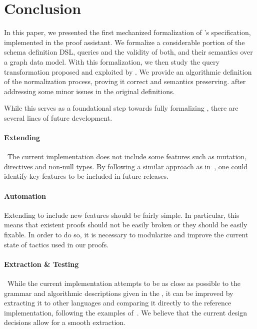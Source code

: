 \section{Conclusion}
\label{sec:conclusion}

In this paper, we presented the first mechanized formalization of \gql's specification, implemented in the \coq proof assistant.
We formalize a considerable portion of the schema definition DSL, queries and the validity of both, and their semantics over a graph data model. 
With this formalization, we then study the query transformation proposed and exploited by \HP. 
We provide an algorithmic definition of the normalization process, proving it correct and semantics preserving. after 
addressing some minor issues in the original definitions.

While this serves as a foundational step towards fully formalizing \gql, there are several lines of future development.
\paragraph{Extending \gcoql} The current implementation does not include some features such as mutation, directives and non-null types. 
By following a similar approach as in~\cite{empiricalgql}, one could identify key features to be included in future releases.

\paragraph{Automation} Extending \gcoql to include new features should be fairly simple. In particular, this means that existent proofs should 
not be easily broken or they should be easily fixable. In order to do so, it is necessary to modularize and improve the current state of tactics used in
our proofs.

\paragraph{Extraction \& Testing} While the current implementation attempts to be as close as possible to the grammar and algorithmic descriptions
given in the \spec, it can be improved by extracting it to other languages and comparing it directly to the reference implementation, following the examples of~\cite{jscert, coqr}.
We believe that the current design decisions allow for a smooth extraction.


